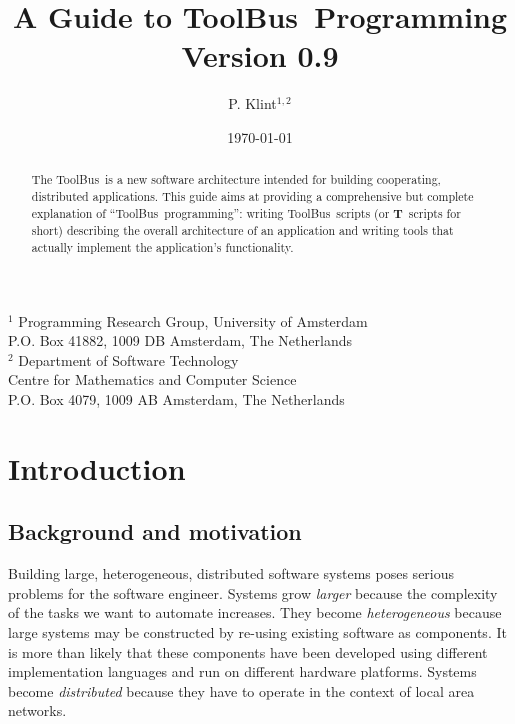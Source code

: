 \setlength{\oddsidemargin}{0.235cm}
\setlength{\evensidemargin}{0.235cm}
\setlength{\textwidth}{16cm}
\topmargin 0.5cm  %
\pagestyle{myheadings}


\newcommand{\TB}{{\sc ToolBus}}
\newcommand{\T}{{\bf T}}
\newcommand{\spec}[1]{{\rm #1}}
\newcommand{\script}[1]{{\tt #1}}
\newcommand{\ASFSDF}{{\sc Asf+Sdf}}
\newcommand{\ASF}{{\sc Asf}}
\newcommand{\SDF}{{\sc Sdf}}
\newcommand{\GEL}{{\sc Gel}}
\newcommand{\iter}{\,^*\,}



\title{A Guide to \TB\ Programming\\
Version 0.9}
\author{P. Klint$^{1,2}$}
\date{\today}
\maketitle
\begin{center}
       {\footnotesize $^1$ Programming Research Group, University of Amsterdam\\
        P.O. Box 41882, 1009 DB Amsterdam, The Netherlands\\
        $^2$ Department of Software Technology\\
        Centre for Mathematics and Computer Science\\
        P.O. Box 4079, 1009 AB Amsterdam, The Netherlands}
\end{center}

\begin{abstract}
The \TB\ is a new software architecture intended for building
cooperating, distributed applications.  This guide aims at providing a
comprehensive but complete explanation of ``\TB\ programming'':
writing \TB{}ripts (or \T\ scripts for short) describing the overall architecture of an
application and writing tools that actually implement the application's
functionality.

\end{abstract}
\tableofcontents

\newpage

\section{Introduction}

\subsection{Background and motivation}
Building large, heterogeneous, distributed software systems poses
serious problems for the software engineer.  Systems grow {\em larger}
because the complexity of the tasks we want to automate
increases.  They become {\em heterogeneous} because large systems may be
constructed by re-using existing software as components.
It is more than likely that these components have been developed
using different implementation languages and run on different
hardware platforms.
Systems become {\em distributed} because they have to operate
in the context of local area networks.


